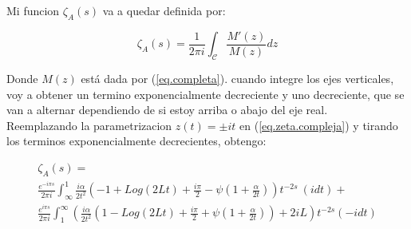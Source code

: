 Mi funcion $ \zeta _A (s) $ va a quedar definida por:

\begin{equation}
\zeta _A (s) = 
\frac{1}{2 \pi i} 
\int _{\mathcal{C}}
\frac{M ' ( z ) }{ M ( z ) } d z
\label{eq.zeta.compleja}
\end{equation}

Donde $M ( z )$ está dada por (\ref{eq.completa}).
cuando integre los ejes verticales, voy a obtener un termino exponencialmente decreciente y uno decreciente, que se van a alternar dependiendo de si estoy arriba o abajo del eje real. \\

Reemplazando la parametrizacion $ z (t) = \pm i t$ en (\ref{eq.zeta.compleja}) y tirando los terminos exponencialmente decrecientes, obtengo:

\begin{comment}

\begin{equation}
\begin{array}{c}
    \zeta _A (s) = \\
     \frac{1}{2 \pi i} \int _{\infty} ^{1}
     \frac{ i \alpha }{2 t^2} 
     \left(
      1 + \frac{i \pi}{2} + Log[2 t] + \psi (1 + \frac{\beta}{2 t})
     \right)
     t ^{-2s}
     e ^{- i \pi s} (i dt) + \\
     \frac{1}{2 \pi i} \int _{\infty} ^{1} 
     \left(
     2 + \frac{\beta}{2 t^2}
     \left(
     1 + \frac{i \pi}{2} - Log[2 t] - \psi (1+ \frac{\beta}{2 t})
     \right)
     t ^{-2s}
     e ^{ i \pi s} (-i dt)
     \right)     
\end{array}
\end{equation}

\end{comment}

\begin{equation}
\begin{array}{c}
    \zeta _A (s) = \\
     \frac{e^{-i \pi s}}{2 \pi i} \int _{\infty} ^{1}
     \frac{ i \alpha}{2 t^2}
     \left(
     - 1 + Log(2 L t) + \frac{i \pi}{2}  - \psi (1+\frac{\alpha}{2 t})
     \right)
     t^{-2 s}
      \ 
     (i dt) + \\
     \frac{e^{i \pi s}}{2 \pi i} \int _1 ^{\infty}
	\left(      
     \frac{ i \alpha}{2  t^2}
     \left(
     1 - Log(2 L t) + \frac{i \pi}{2} + \psi (1 + \frac{\alpha}{2 t}) 
      
     \right)
     + 2 i L
     \right)
     t^{-2 s}
     (-i dt)
     
\end{array}
\end{equation}

